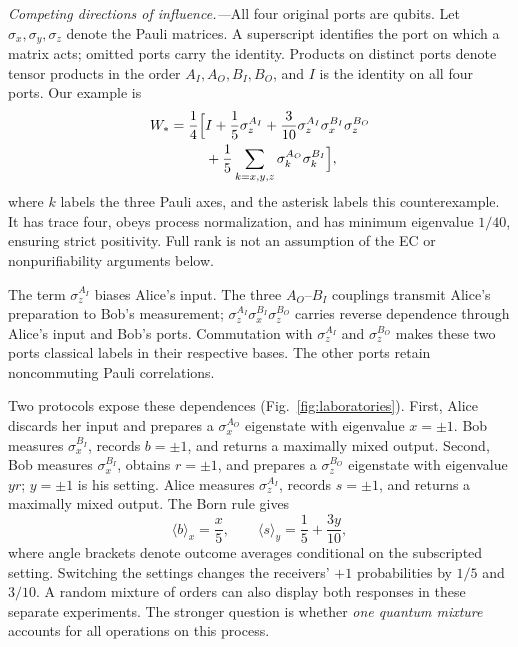 \documentclass[aps,prl,reprint,superscriptaddress,longbibliography,bibnotes,floatfix]{revtex4-2}
\begin{document}
\emph{Competing directions of influence.---}All four original ports are qubits. Let $\sigma_x,\sigma_y,\sigma_z$ denote the Pauli matrices. A superscript identifies the port on which a matrix acts; omitted ports carry the identity. Products on distinct ports denote tensor products in the order $A_I,A_O,B_I,B_O$, and $I$ is the identity on all four ports. Our example is
\begin{align}
 W_* =\frac14\Bigl[&I+\frac15\sigma_z^{A_I}
 +\frac3{10}\sigma_z^{A_I}\sigma_x^{B_I}\sigma_z^{B_O}\notag\\
 &+\frac15\sum_{k=x,y,z}\sigma_k^{A_O}\sigma_k^{B_I}\Bigr],
 \label{eq:process}
\end{align}
where $k$ labels the three Pauli axes, and the asterisk labels this counterexample. It has trace four, obeys process normalization, and has minimum eigenvalue $1/40$, ensuring strict positivity. Full rank is not an assumption of the EC or nonpurifiability arguments below.

The term $\sigma_z^{A_I}$ biases Alice's input. The three $A_O$--$B_I$ couplings transmit Alice's preparation to Bob's measurement; $\sigma_z^{A_I}\sigma_x^{B_I}\sigma_z^{B_O}$ carries reverse dependence through Alice's input and Bob's ports. Commutation with $\sigma_z^{A_I}$ and $\sigma_z^{B_O}$ makes these two ports classical labels in their respective bases. The other ports retain noncommuting Pauli correlations.

Two protocols expose these dependences (Fig.~\ref{fig:laboratories}). First, Alice discards her input and prepares a $\sigma_x^{A_O}$ eigenstate with eigenvalue $x=\pm1$. Bob measures $\sigma_x^{B_I}$, records $b=\pm1$, and returns a maximally mixed output. Second, Bob measures $\sigma_x^{B_I}$, obtains $r=\pm1$, and prepares a $\sigma_z^{B_O}$ eigenstate with eigenvalue $yr$; $y=\pm1$ is his setting. Alice measures $\sigma_z^{A_I}$, records $s=\pm1$, and returns a maximally mixed output. The Born rule gives
\begin{equation}
 \langle b\rangle_x=\frac{x}{5},\qquad
 \langle s\rangle_y=\frac15+\frac{3y}{10},
 \label{eq:directional-response}
\end{equation}
where angle brackets denote outcome averages conditional on the subscripted setting. Switching the settings changes the receivers' $+1$ probabilities by $1/5$ and $3/10$. A random mixture of orders can also display both responses in these separate experiments. The stronger question is whether \emph{one quantum mixture} accounts for all operations on this process.
\end{document}
